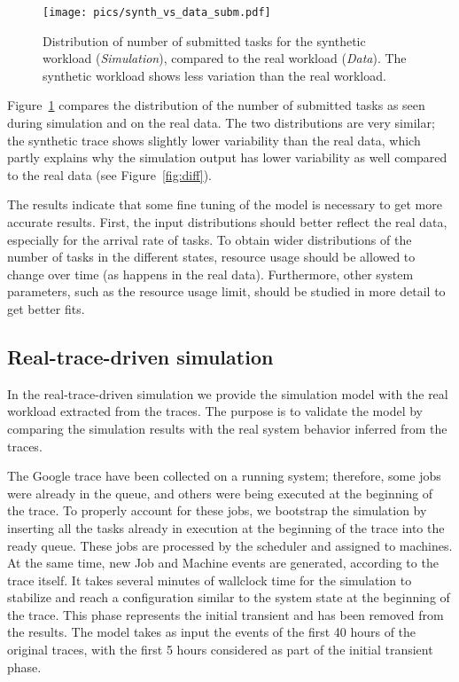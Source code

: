 \documentclass{article}
\begin{document}
\begin{figure}
\centering
  \texttt{[image: pics/synth\_vs\_data\_subm.pdf]}
\caption{Distribution of number of submitted  tasks for the synthetic workload (\emph{Simulation}), compared to the real workload (\emph{Data}). The synthetic workload shows less variation than the real workload. }
\label{fig:diff1}       
\end{figure}

Figure~\ref{fig:diff1} compares the distribution of the number of submitted tasks as seen during simulation and on the real data. The two distributions are very similar; the synthetic trace shows slightly lower variability than the real data, which partly explains why the simulation output has lower variability as well compared to the real data (see Figure~\ref{fig:diff}).

The results indicate that some fine tuning of the model is necessary to get more accurate results. First, the input distributions should better reflect the real data, especially for the arrival rate of tasks. To obtain wider distributions of the number of tasks in the different states, resource usage should be allowed to change over time (as happens in the real data). Furthermore, other system parameters, such as the resource usage limit, should be studied in more detail to get better fits.

\subsection{Real-trace-driven simulation}
\label{sec:real}




In the real-trace-driven simulation we provide the simulation model with the real workload extracted from the traces. The purpose is to validate the model by comparing the simulation results with the real system behavior inferred from the traces.

The Google trace have been collected on a running system; therefore, some jobs were already in the queue, and others were being executed at the beginning of the trace. To properly account for these jobs, we bootstrap the simulation by inserting all the tasks already in execution at the beginning of the trace into the ready queue. These jobs are processed by the scheduler and assigned to machines. At the same time, new Job and Machine events are generated, according to the trace itself. It takes several minutes of wallclock time for the simulation to stabilize and reach a configuration similar to the system state at the beginning of the trace. This phase represents the initial transient and has been removed from the results. The model takes as input the events of the first 40 hours of the original traces, with the first 5 hours considered as part of the initial transient phase.
\end{document}
